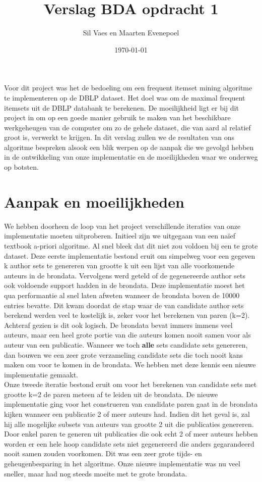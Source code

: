 \documentclass[11pt]{article}
\author{Sil Vaes en Maarten Evenepoel}
\date{\today}
\title{Verslag BDA opdracht 1}
\begin{document}
\maketitle
\setlength\parindent{0pt}

Voor dit project was het de bedoeling om een frequent itemset mining algoritme te implementeren op de DBLP dataset. Het doel was om de maximal frequent itemsets uit de DBLP databank te berekenen. De moeilijkheid ligt er bij dit project in om op een goede manier gebruik te maken van het beschikbare werkgeheugen van de computer om zo de gehele dataset, die van aard al relatief groot is, verwerkt te krijgen. In dit verslag zullen we de resultaten van ons algoritme bespreken alsook een blik werpen op de aanpak die we gevolgd hebben in de ontwikkeling van onze implementatie en de moeilijkheden waar we onderweg op botsten.

\section{Aanpak en moeilijkheden}

We hebben doorheen de loop van het project verschillende iteraties van onze implementatie moeten uitproberen. Initieel zijn we uitgegaan van een na\"ief textbook a-priori algoritme. Al snel bleek dat dit niet zou voldoen bij een te grote dataset. Deze eerste implementatie bestond eruit om simpelweg voor een gegeven k author sets te genereren van grootte k uit een lijst van alle voorkomende auteurs in de brondata. Vervolgens werd geteld of de gegenereerde author sets ook voldoende support hadden in de brondata. Deze implementatie moest het qua performantie al snel laten afweten wanneer de brondata boven de 10000 entries bevatte. Dit kwam doordat de stap waar de van candidate author sets berekend werden veel te kostelijk is, zeker voor het berekenen van paren (k=2). Achteraf gezien is dit ook logisch. De brondata bevat immers immens veel auteurs, maar een heel grote portie van die auteurs komen nooit samen voor als auteur van een publicatie. Wanneer we toch \textbf{alle} sets candidate sets genereren, dan bouwen we een zeer grote verzameling candidate sets die toch nooit kans maken om voor te komen in de brondata. We hebben met deze kennis een nieuwe implementatie gemaakt.\\

Onze tweede iteratie bestond eruit om voor het berekenen van candidate sets met grootte k=2 de paren meteen af te leiden uit de brondata. De nieuwe implementatie ging voor het construeren van candidate paren gaat in de brondata kijken wanneer een publicatie 2 of meer auteurs had. Indien dit het geval is, zal hij alle mogelijke subsets van auteurs van grootte 2 uit die publicaties genereren. Door enkel paren te generen uit publicaties die ook echt 2 of meer auteurs hebben worden er een hele hoop candidate sets niet gegenereerd die anders gegarandeerd nooit samen zouden voorkomen. Dit was een zeer grote tijds- en geheugenbesparing in het algoritme. Onze nieuwe implementatie was nu veel sneller, maar had nog steeds moeite met te grote brondata.\\
\end{document}
